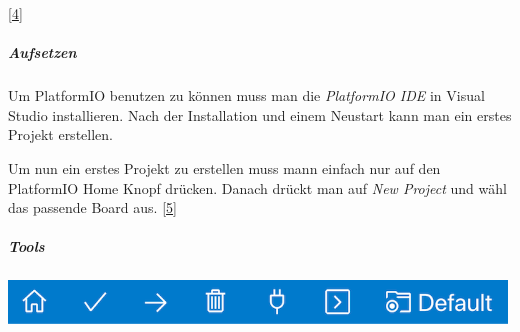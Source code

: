 \documentclass[
    headings=optiontotocandhead,%
    twoside,
    numbers=noenddot,%
    12pt, %
    titlepage, %
    parskip=full, %
    listof=leveldown, 
    numbers=noenddot, %
    a4paper,DIV=14,
    BCOR=15mm,
]{scrbook}
\let\origfigure=\figure
\let\endorigfigure=\endfigure
\renewenvironment{figure}[1][]{%
   \origfigure[H]
}{%
   \endorigfigure
}
\begin{document}
{[}\protect\hyperlink{ref-gpt-inifile}{4}{]}

\hypertarget{aufsetzen}{%
\subparagraph{Aufsetzen}\label{aufsetzen}}

Um PlatformIO benutzen zu können muss man die \emph{PlatformIO IDE} in
Visual Studio installieren. Nach der Installation und einem Neustart
kann man ein erstes Projekt erstellen.

Um nun ein erstes Projekt zu erstellen muss mann einfach nur auf den
PlatformIO Home Knopf drücken. Danach drückt man auf \emph{New Project}
und wähl das passende Board aus.
{[}\protect\hyperlink{ref-PlatformIO-firststeps}{5}{]}

\hypertarget{tools}{%
\subparagraph{Tools}\label{tools}}

\begin{figure}
\centering
\includegraphics[width=5.20833in,height=\textheight]{img/Kampl/platformio-ide-vscode-toolbar.png}
\caption{Toolbar {[}\protect\hyperlink{ref-PlatformIO-firststeps}{5}{]}}
\end{figure}
\end{document}
